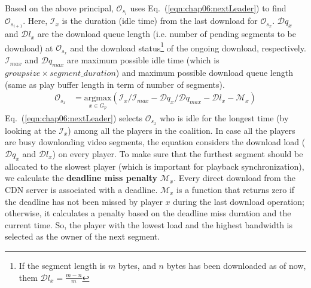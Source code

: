 Based on the above principal, $\mathcal{O}_{s_{i}}$ uses Eq.~(\ref{eqn:chap06:nextLeader}) to find $\mathcal{O}_{s_{i+1}}$. Here, $\mathcal{I}_x$ is the duration (idle time) from the last download for $\mathcal{O}_{s_{x}}$. $\mathcal{D}{q_x}$ and $\mathcal{D}{l_x}$ are the download queue length (i.e. number of pending segments to be download) at $\mathcal{O}_{s_{x}}$ and the download status\footnote{If the segment length is $m$ bytes, and $n$ bytes has been downloaded as of now, them  $\mathcal{D}{l_x} = \frac{m-n}{m}$ } of the ongoing download, respectively. $\mathcal{I}_{max}$ and $\mathcal{D}q_{max}$ are maximum possible idle time (which is $groupsize\times segment\_duration$) and maximum possible download queue length (same as play buffer length in term of number of segments).
\begin{align}
\label{eqn:chap06:nextLeader}
\mathcal{O}_{s_{x}} &= \underset{x \in G_p}{\mathrm{argmax}} \left( {\mathcal{I}_x}/{\mathcal{I}_{max}} - {\mathcal{D}{q_x}}/{\mathcal{D}q_{max}} - \mathcal{D}{l_x} - \mathcal{M}_x \right)
\end{align}
Eq.~(\ref{eqn:chap06:nextLeader}) selects $\mathcal{O}_{s_{x}}$ who is idle for the longest time (by looking at the $\mathcal{I}_x$) among all the players in the coalition. In case all the players are busy downloading video segments, the equation considers the download load ($\mathcal{D}{q_x}$ and $\mathcal{D}{l_x}$) on every player. To make sure that the furthest segment should be allocated to the slowest player (which is important for playback synchronization), we calculate the \textbf{deadline miss penalty} $\mathcal{M}_x$. Every direct download from the CDN server is associated with a deadline. $\mathcal{M}_x$ is a function that returns zero if the deadline has not been missed by player $x$ during the last download operation; otherwise, it calculates a penalty based on the deadline miss duration and the current time. So, the player with the lowest load and the highest bandwidth is selected as the owner of the next segment.

